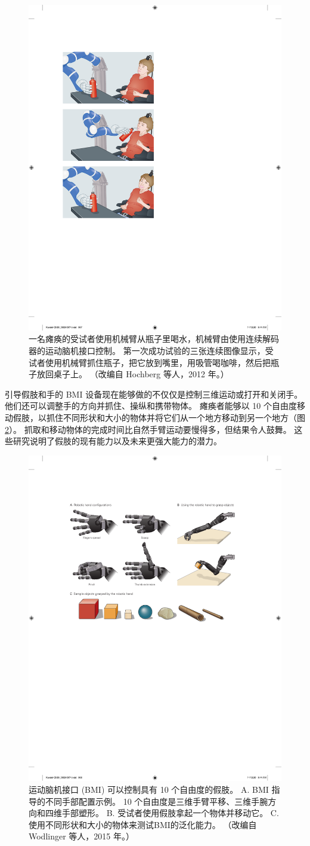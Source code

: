 \begin{figure}[htbp]
	\centering
	\includegraphics[width=0.5\linewidth]{chap39/fig_39_9}
	\caption{一名瘫痪的受试者使用机械臂从瓶子里喝水，机械臂由使用连续解码器的运动脑机接口控制。 
		第一次成功试验的三张连续图像显示，受试者使用机械臂抓住瓶子，把它放到嘴里，用吸管喝咖啡，然后把瓶子放回桌子上。 
		（改编自 Hochberg 等人，2012 年。）}
	\label{fig:39_9}
\end{figure}


引导假肢和手的 BMI 设备现在能够做的不仅仅是控制三维运动或打开和关闭手。 
他们还可以调整手的方向并抓住、操纵和携带物体。 
瘫痪者能够以 10 个自由度移动假肢，以抓住不同形状和大小的物体并将它们从一个地方移动到另一个地方（图 \ref{fig:39_10}）。 
抓取和移动物体的完成时间比自然手臂运动要慢得多，但结果令人鼓舞。 这些研究说明了假肢的现有能力以及未来更强大能力的潜力。

\begin{figure}[htbp]
	\centering
	\includegraphics[width=0.5\linewidth]{chap39/fig_39_10}
	\caption{运动脑机接口 (BMI) 可以控制具有 10 个自由度的假肢。 
		A. BMI 指导的不同手部配置示例。 
		10 个自由度是三维手臂平移、三维手腕方向和四维手部塑形。 
		B. 受试者使用假肢拿起一个物体并移动它。 
		C. 使用不同形状和大小的物体来测试BMI的泛化能力。 
		（改编自 Wodlinger 等人，2015 年。）}
	\label{fig:39_10}
\end{figure}

